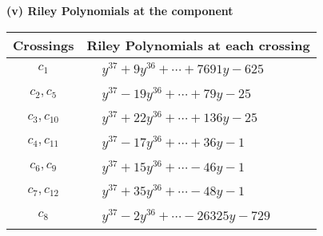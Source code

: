 \documentclass[1p]{elsarticle_modified}
\theoremstyle{definition}
\begin{document}
\newpage\renewcommand{\arraystretch}{1}
\flushleft \textbf{(v) Riley Polynomials at the component}\newline \\
\begin{tabular}{m{50pt}|m{274pt}}
Crossings & \hspace{64pt}Riley Polynomials at each crossing \\
\hline $$\begin{aligned}c_{1}\end{aligned}$$&$\begin{aligned}
&y^{37}+9 y^{36}+\cdots+7691 y-625
\end{aligned}$\\
\hline $$\begin{aligned}c_{2},c_{5}\end{aligned}$$&$\begin{aligned}
&y^{37}-19 y^{36}+\cdots+79 y-25
\end{aligned}$\\
\hline $$\begin{aligned}c_{3},c_{10}\end{aligned}$$&$\begin{aligned}
&y^{37}+22 y^{36}+\cdots+136 y-25
\end{aligned}$\\
\hline $$\begin{aligned}c_{4},c_{11}\end{aligned}$$&$\begin{aligned}
&y^{37}-17 y^{36}+\cdots+36 y-1
\end{aligned}$\\
\hline $$\begin{aligned}c_{6},c_{9}\end{aligned}$$&$\begin{aligned}
&y^{37}+15 y^{36}+\cdots-46 y-1
\end{aligned}$\\
\hline $$\begin{aligned}c_{7},c_{12}\end{aligned}$$&$\begin{aligned}
&y^{37}+35 y^{36}+\cdots-48 y-1
\end{aligned}$\\
\hline $$\begin{aligned}c_{8}\end{aligned}$$&$\begin{aligned}
&y^{37}-2 y^{36}+\cdots-26325 y-729
\end{aligned}$\\
\hline
\end{tabular}\\~\\
\end{document}
